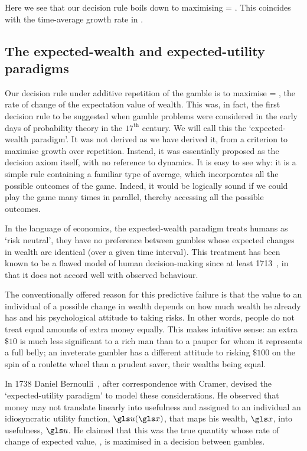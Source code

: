 Here we see that our decision rule boils down to maximising
\be
\ave{\frac{\ln \gr}{\dt}} = \ave{\frac{\ln(\x(\tn)+\q)-\ln \x(\tn)}{\dt}}.
\ee
This coincides with the time-average growth rate in .

\subsection{The expected-wealth and expected-utility paradigms}
Our decision rule under additive repetition of the gamble is to maximise
\be
\ave{\frac{\d\x}{\dt}} = \ave{\frac{\q}{\dt}},
\ee
\ie the rate of change of the expectation value of wealth. This was, in fact, the first 
decision rule to be suggested when gamble problems were considered in the early 
days of probability theory in the $17^\text{th}$ century. We will call this the 
`expected-wealth paradigm'. It was not derived as we have derived it, from a 
criterion to maximise growth over repetition. Instead, it was essentially proposed 
as the decision axiom itself, with no reference to dynamics. It is easy to see why: 
it is a simple rule containing a familiar type of average, which incorporates all the 
possible outcomes of the game. Indeed, it would be logically sound if we could play 
the game many times in parallel, thereby accessing all the possible outcomes.

In the language of economics, the expected-wealth paradigm treats humans as 
`risk neutral', \ie they have no preference between gambles whose expected 
changes in wealth are identical (over a given time interval). This treatment has 
been known to be a flawed model of human decision-making since at least 
1713~\cite[p.~402]{Montmort1713}, in that it does not accord well with observed behaviour.

The conventionally offered reason for this predictive failure is that the value to an 
individual of a possible change in wealth depends on how much wealth he already 
has and his psychological attitude to taking risks. In other words, people do not 
treat equal amounts of extra money equally. This makes intuitive sense: an extra 
$\$10$ is much less significant to a rich man than to a pauper for whom it 
represents a full belly; an inveterate gambler has a different attitude to risking 
$\$100$ on the spin of a roulette wheel than a prudent saver, their wealths 
being equal.

In 1738 Daniel Bernoulli~\cite{Bernoulli1738}, after correspondence with Cramer, devised the `expected-utility paradigm' to model these considerations. He observed that money may not translate linearly into usefulness and assigned to an individual an idiosyncratic utility function, $\gu(\x)$, that maps his wealth, $\x$, 
into usefulness, $\gu$. He claimed that this was the true quantity whose rate of change of expected value,
\be
\ave{\gr_\gu} \equiv \ave{\frac{\d\gu(\x)}{\dt}},
\ee
is maximised in a decision between gambles.

